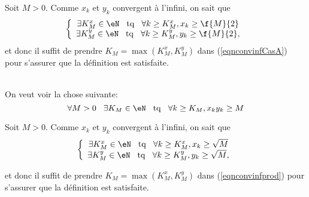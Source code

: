 \noindent Soit $M> 0$. Comme $x_k$ et $y_k$ convergent à l'infini, on sait que 
\[\left\{\begin{array}{c}   
         \exists K^x_M \in \eN \hspace{0.3cm} {\rm tq} \hspace{0.3cm} \forall k \geq K^x_M, x_k \geq \f{M}{2}\\																		 
        \exists K^y_M \in \eN \hspace{0.3cm} {\rm tq} \hspace{0.3cm} \forall k \geq K^y_M, y_k \geq \f{M}{2},																		
\end{array}\right.\]
et donc il suffit de prendre $K_M = \max(K_M^x, K_M^y)$ dans (\ref{eqnconvinfCasA}) pour s'assurer que la définition est satisfaite.


\vspace{0.5cm}
\\

\noindent On veut voir la chose suivante:
\begin{equation}
 \label{eqnconvinfprod}  \forall M > 0 \hspace{0.3cm} \exists K_M \in \eN \hspace{0.3cm} {\rm tq} \hspace{0.3cm} \forall k \geq K_M, x_k  y_k \geq M \end{equation}

\noindent Soit $M> 0$. Comme $x_k$ et $y_k$ convergent à l'infini, on sait que 
\[\left\{\begin{array}{c}   
         \exists K^x_M \in \eN \hspace{0.3cm} {\rm tq} \hspace{0.3cm} \forall k \geq K^x_M, x_k \geq \sqrt M\\																		 
        \exists K^y_M \in \eN \hspace{0.3cm} {\rm tq} \hspace{0.3cm} \forall k \geq K^y_M, y_k \geq \sqrt M,																		
\end{array}\right.\]

\noindent et donc il suffit  de prendre  $K_M = \max(K_M^x, K_M^y)$ dans (\ref{eqnconvinfprod}) pour s'assurer que la définition est satisfaite.

\vspace{0.5cm}
\\

